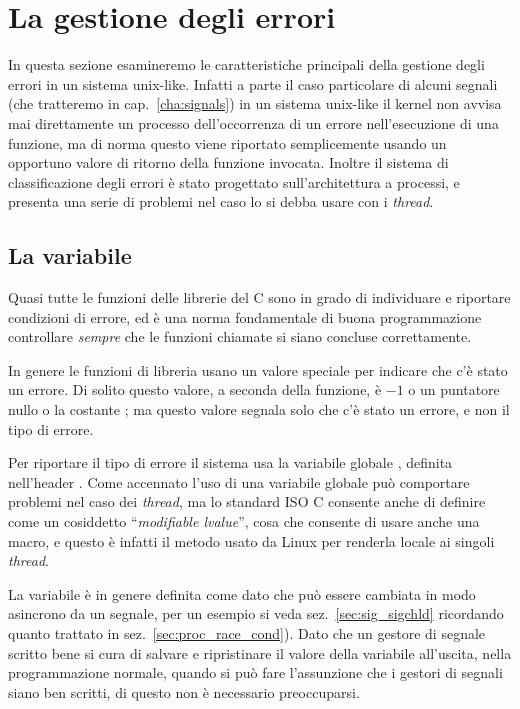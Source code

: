 
\section{La gestione degli errori}
\label{sec:sys_errors}

In questa sezione esamineremo le caratteristiche principali della gestione
degli errori in un sistema unix-like. Infatti a parte il caso particolare di
alcuni segnali (che tratteremo in cap.~\ref{cha:signals}) in un sistema
unix-like il kernel non avvisa mai direttamente un processo dell'occorrenza di
un errore nell'esecuzione di una funzione, ma di norma questo viene riportato
semplicemente usando un opportuno valore di ritorno della funzione invocata.
Inoltre il sistema di classificazione degli errori è stato progettato
sull'architettura a processi, e presenta una serie di problemi nel caso lo si
debba usare con i \textit{thread}.


\subsection{La variabile }
\label{sec:sys_errno}

Quasi tutte le funzioni delle librerie del C sono in grado di individuare e
riportare condizioni di errore, ed è una norma fondamentale di buona
programmazione controllare \textsl{sempre} che le funzioni chiamate si siano
concluse correttamente.

In genere le funzioni di libreria usano un valore speciale per indicare che
c'è stato un errore. Di solito questo valore, a seconda della funzione, è $-1$
o un puntatore nullo o la costante ; ma questo valore segnala solo
che c'è stato un errore, e non il tipo di errore.

Per riportare il tipo di errore il sistema usa la variabile globale
, definita nell'header .  Come accennato l'uso di
una variabile globale può comportare problemi nel caso dei \textit{thread}, ma
lo standard ISO C consente anche di definire  come un cosiddetto
``\textit{modifiable lvalue}'', cosa che consente di usare anche una macro, e
questo è infatti il metodo usato da Linux per renderla locale ai singoli
\textit{thread}.

La variabile è in genere definita come  dato che può essere
cambiata in modo asincrono da un segnale, per un esempio si veda
sez.~\ref{sec:sig_sigchld} ricordando quanto trattato in
sez.~\ref{sec:proc_race_cond}). Dato che un gestore di segnale scritto bene si
cura di salvare e ripristinare il valore della variabile all'uscita, nella
programmazione normale, quando si può fare l'assunzione che i gestori di
segnali siano ben scritti, di questo non è necessario preoccuparsi.

